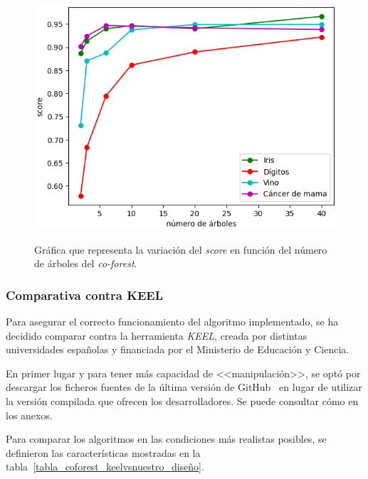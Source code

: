 \begin{figure}[h]
	\caption{Gráfica que representa la variación del \textit{score} en función del número de árboles del \textit{co-forest}.}
	\centering
	\includegraphics[width=\textwidth]{../img/memoria/5_coforest_score-arboles}
	\label{5_score-arboles}
\end{figure}

\subsubsection{Comparativa contra KEEL}

Para asegurar el correcto funcionamiento del algoritmo implementado, se ha decidido comparar contra la herramienta \textit{KEEL}, creada por distintas universidades españolas y financiada por el Ministerio de Educación y Ciencia.

En primer lugar y para tener más capacidad de <<manipulación>>, se optó por descargar los ficheros fuentes de la última versión de GitHub~\cite{keelRepo} en lugar de utilizar la versión compilada que ofrecen los desarrolladores. Se puede consultar cómo en los anexos.

Para comparar los algoritmos en las condiciones más realistas posibles, se definieron las características mostradas en la tabla~\ref{tabla_coforest_keelvsnuestro_diseño}.

